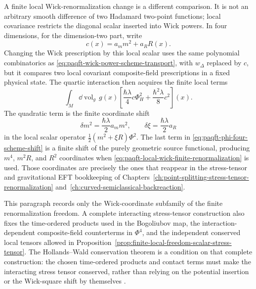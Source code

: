 A finite local Wick-renormalization change is a different comparison.  It is
not an arbitrary smooth difference of two Hadamard two-point functions; local
covariance restricts the diagonal scalar inserted into Wick powers.  In four
dimensions, for the dimension-two part, write
\begin{equation}
  c(x)=a_m m^2+a_R R(x).
  \label{eq:paqft-local-wick-finite-renormalization}
\end{equation}
Changing the Wick prescription by this local scalar uses the same polynomial
combinatorics as \eqref{eq:paqft-wick-power-scheme-transport}, with
\(w_\Delta\) replaced by \(c\), but it compares two local covariant
composite-field prescriptions in a fixed physical state.  The quartic
interaction then acquires the finite local terms
\[
  \int_M\dd\operatorname{vol}_g\,g(x)
  \left[
    \frac{\hbar\lambda}{4}c\Phi_H^2
    +
    \frac{\hbar^2\lambda}{8}c^2
  \right](x).
\]
The quadratic term is the finite coordinate shift
\begin{equation}
  \delta m^2=\frac{\hbar\lambda}{2}a_m m^2,
  \qquad
  \delta\xi=\frac{\hbar\lambda}{2}a_R
  \label{eq:paqft-phi-four-mass-curvature-shifts}
\end{equation}
in the local scalar operator
\(\frac12(m^2+\xi R)\Phi^2\).  The last term in
\eqref{eq:paqft-phi-four-scheme-shift} is a finite shift of the purely
geometric source functional, producing \(m^4\), \(m^2R\), and \(R^2\)
coordinates when \eqref{eq:paqft-local-wick-finite-renormalization} is used.
Those coordinates are precisely the ones that reappear in the stress-tensor
and gravitational EFT bookkeeping of
Chapters~\ref{ch:point-splitting-stress-tensor-renormalization}
and~\ref{ch:curved-semiclassical-backreaction}.

This paragraph records only the Wick-coordinate subfamily of the finite
renormalization freedom.  A complete interacting stress-tensor construction
also fixes the time-ordered products used in the Bogoliubov map, the
interaction-dependent composite-field counterterms in \(\Phi^4\), and the
independent conserved local tensors allowed in
Proposition~\ref{prop:finite-local-freedom-scalar-stress-tensor}.  The
Hollands--Wald conservation theorem is a condition on that complete
construction: the chosen time-ordered products and contact terms must make the
interacting stress tensor conserved, rather than relying on the potential
insertion or the Wick-square shift by themselves
\cite{HollandsWald2001LocalWick,HollandsWald2005Conservation,HollandsWald2015QFCS}.

